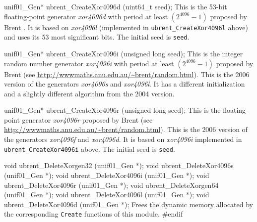 unif01_Gen* ubrent_CreateXor4096d (uint64_t seed);
\endcode
  \tab This is the 53-bit floating-point generator \textit{xor4096d}
 with period at least $(2^{4096}-1)$ proposed by Brent \cite{rBRE04a}.
  It is based on \textit{xor4096l} (implemented in \texttt{ubrent\_CreateXor4096l}
  above) and uses its 53  most significant bits. The initial seed is \texttt{seed}.
%
 \endtab
\code

\endcode

\code

unif01_Gen* ubrent_CreateXor4096i (unsigned long seed);
\endcode
  \tab This is the %
  integer random number generator  \textit{xor4096i} with period at least
 $(2^{4096}-1)$ proposed by Brent (see
  \url{http://wwwmaths.anu.edu.au/~brent/random.html}).  This is the
   {2006 version} of the generators \textit{xor4096s} and
  \textit{xor4096l}. It has a different initialization and a slightly
  different algorithm from the 2004 version.
%
  \endtab
\code


unif01_Gen* ubrent_CreateXor4096r (unsigned long seed);
\endcode
  \tab This is the floating-point generator \textit{xor4096r} proposed by Brent
  (see \url{http://wwwmaths.anu.edu.au/~brent/random.html}).
  This is the {2006 version} of the generators \textit{xor4096f} and
  \textit{xor4096d}. It is based on \textit{xor4096i} implemented in
  \texttt{ubrent\_CreateXor4096i} above. The initial seed is \texttt{seed}.
%
 \endtab


\code

void ubrent_DeleteXorgen32 (unif01_Gen *);
void ubrent_DeleteXor4096s (unif01_Gen *);
void ubrent_DeleteXor4096i (unif01_Gen *);
void ubrent_DeleteXor4096r (unif01_Gen *);
void ubrent_DeleteXorgen64 (unif01_Gen *);
void ubrent_DeleteXor4096l (unif01_Gen *);
void ubrent_DeleteXor4096d (unif01_Gen *);
\endcode
  \tab Frees the dynamic memory allocated by the corresponding
  \texttt{Create} functions of this module. \endtab
\code\hide
#endif
\endhide\endcode
